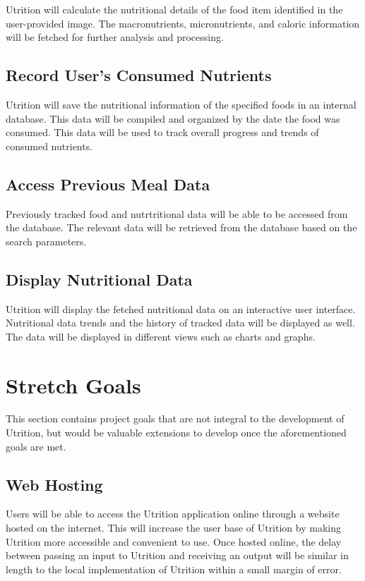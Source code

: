 \documentclass{article}
\begin{document}
Utrition will calculate the nutritional details of the food item identified in the user-provided image. The macronutrients, micronutrients, and caloric information will be fetched for further analysis and processing.

\subsection{Record User's Consumed Nutrients}

Utrition will save the nutritional information of the specified foods in an internal database. This data will be compiled and organized by the date the food was consumed. This data will be used to track overall progress and trends of consumed nutrients.

\subsection{Access Previous Meal Data}

Previously tracked food and nutrtritional data will be able to be accessed from the database. The relevant data will be retrieved from the database based on the search parameters.

\subsection{Display Nutritional Data}

Utrition will display the fetched nutritional data on an interactive user interface. Nutritional data trends and the history of tracked data will be displayed as well. The data will be displayed in different views such as charts and graphs. 

\section{Stretch Goals}

This section contains project goals that are not integral to the development of Utrition, but would be valuable extensions to develop once the aforementioned goals are met.

\subsection{Web Hosting}

Users will be able to access the Utrition application online through a website hosted on the internet. This will increase the user base of Utrition by making Utrition more accessible and convenient to use. Once hosted online, the delay between passing an input to Utrition and receiving an output will be similar in length to the local implementation of Utrition within a small margin of error.
\end{document}
